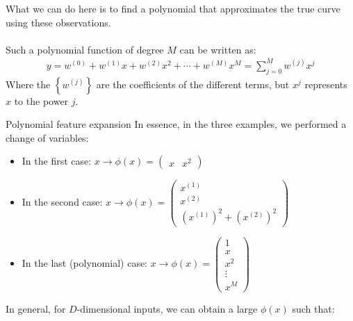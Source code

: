 What we can do here is to find a polynomial that approximates the true curve using these observations.\\
$ $\\
Such a polynomial function of degree $M$ can be written as:
\begin{align*} 
	y = w^{\left(0\right)} + w^{\left(1\right)}x + w^{\left(2\right)}x^2 + \cdots + w^{\left(M\right)}x^{M} =  \sum_{j= 0}^{M}w^{\left(j\right)}x^{j}
\end{align*}
Where the $\left\{w^{\left(j\right)}\right\}$ are the coefficients of the different terms, but $x^{j}$ represents $x$ to the power $j$.

\begin{parag}{Polynomial feature expansion}
    In essence, in the three examples, we performed a change of variables:
	\begin{itemize}
	    \item In the first case: $x \to \phi\left(x\right) =  \begin{pmatrix} x & x^2 \end{pmatrix} $
		\item In the second case: $x \to \phi\left(x\right) = \begin{pmatrix} x^{\left(1\right)} \\ x^{\left(2\right)} \\ \left(x^{\left(1\right)}\right)^2 + \left(x^{\left(2\right)}\right)^2 \end{pmatrix} $
		\item In the last (polynomial) case: $x \to \phi\left(x\right) = \begin{pmatrix} 1 \\ x \\ x^2 \\ \vdots \\ x^{M} \end{pmatrix} $
	\end{itemize}
	In general, for $D$-dimensional inputs, we can obtain a large $\phi\left(x\right)$ such that:
	\begin{align*} 

\end{align*}
\end{parag}
